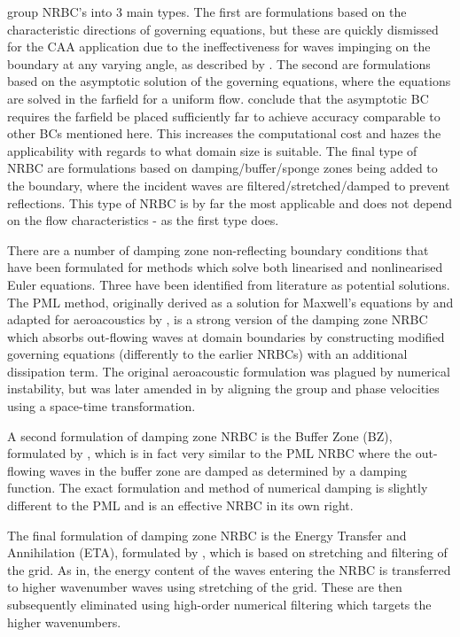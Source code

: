 \textcite{kim2000generalizedcharbc} group NRBC's into 3 main types. The first are formulations based on the characteristic directions of governing equations, but these are quickly dismissed for the CAA application due to the ineffectiveness for waves impinging on the boundary at any varying angle, as described by \textcite{colonius2004modelling}. The second are formulations based on the asymptotic solution of the governing equations, where the equations are solved in the farfield for a uniform flow. \textcite{bayliss1982farfield} conclude that the asymptotic BC requires the farfield be placed sufficiently far to achieve accuracy comparable to other BCs mentioned here. This increases the computational cost and hazes the applicability with regards to what domain size is suitable. The final type of NRBC are formulations based on damping/buffer/sponge zones being added to the boundary, where the incident waves are filtered/stretched/damped to prevent reflections. This type of NRBC is by far the most applicable and does not depend on the flow characteristics - as the first type does.

There are a number of damping zone non-reflecting boundary conditions that have been formulated for methods which solve both linearised and nonlinearised Euler equations. Three have been identified from literature as potential solutions.
The PML method, originally derived as a solution for Maxwell's equations by \textcite{berenger1994apml} and adapted for aeroacoustics by \textcite{hu1996onabsorbingbc} \cite{hu2001astablePML} \cite{hu2005aPML}, is a strong version of the damping zone NRBC which absorbs out-flowing waves at domain boundaries by constructing modified governing equations (differently to the earlier NRBCs) with an additional dissipation term. The original aeroacoustic formulation was plagued by numerical instability, but was later amended in \cite{hu2005aPML} by aligning the group and phase velocities using a space-time transformation.

A second formulation of damping zone NRBC is the Buffer Zone (BZ), formulated by \textcite{wasitho1997simulationtfsei}, which is in fact very similar to the PML NRBC where the out-flowing waves in the buffer zone are damped as determined by a damping function. The exact formulation and method of numerical damping is slightly different to the PML and is an effective NRBC in its own right.


The final formulation of damping zone NRBC is the Energy Transfer and Annihilation (ETA), formulated by \textcite{edgar2012generalbufferzone}, which is based on stretching and filtering of the grid. As in, the energy content of the waves entering the NRBC is transferred to higher wavenumber waves using stretching of the grid. These are then subsequently eliminated using high-order numerical filtering which targets the higher wavenumbers.


